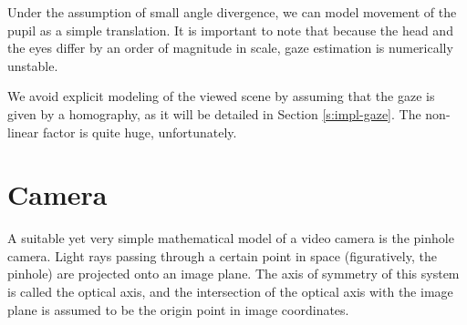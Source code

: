 
Under the assumption of small angle divergence, we can model movement of the pupil as a simple translation.
It is important to note that because the head and the eyes differ by an order of magnitude in scale, gaze estimation is numerically unstable.

We avoid explicit modeling of the viewed scene by assuming that the gaze is given by a homography, as it will be detailed in Section \ref{s:impl-gaze}.
The non-linear factor is quite huge, unfortunately.

\section{Camera}

A suitable yet very simple mathematical model of a video camera is the pinhole camera.
Light rays passing through a certain point in space (figuratively, the pinhole) are projected onto an image plane.
The axis of symmetry of this system is called the optical axis, and the intersection of the optical axis with the image plane is assumed to be the origin point in image coordinates.

